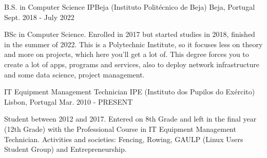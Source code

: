 


\begin{cventries}


  \cventry
  {B.S. in Computer Science} %
  {IPBeja (Instituto Politécnico de Beja)} %
  {Beja, Portugal} %
  {Sept. 2018 - July 2022} %
  { %
    \begin{cvitems}
      \item {BSc in Computer Science. Enrolled in 2017 but started studies in 2018, finished in the summer of 2022.
                  This is a Polytechnic Institute, so it focuses less on theory and more on projects, which here you'll get a lot of. This degree forces you to create a lot of apps, programs and services, also to deploy network infrastructure and some data science, project management.}
    \end{cvitems}
  }

  \cventry
  {IT Equipment Management Technician} %
  {IPE (Instituto dos Pupilos do Exército)} %
  {Lisbon, Portugal} %
  {Mar. 2010 - PRESENT} %
  { %
    \begin{cvitems}
      \item {Student between 2012 and 2017. Entered on 8th Grade and left in the final year (12th Grade) with the Professional Course in IT Equipment Management Technician. Activities and societies: Fencing, Rowing, GAULP (Linux Users Student Group) and Entrepreneurship.}
    \end{cvitems}
  }


\end{cventries}